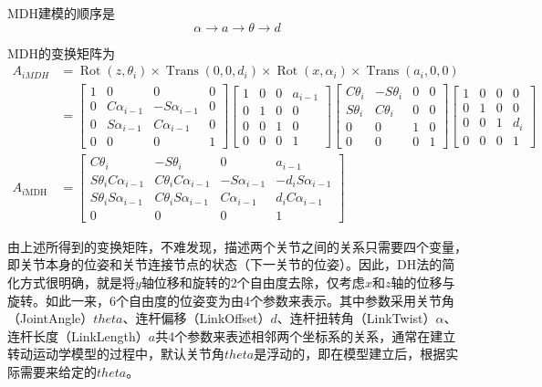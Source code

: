 \documentclass[UTF8]{article}%
\newcommand{\n}{\par}%
\begin{document}
\begin{spacing}{1.5}
	MDH建模的顺序是$$\alpha\rightarrow a\rightarrow\theta\rightarrow d$$\n
	MDH的变换矩阵为\\
	$\begin{aligned}
		A_{iMDH}&=\operatorname{Rot}\left(z,\theta_{i}\right)\times\operatorname{Trans}\left(0,0,d_{i}\right)\times\operatorname{Rot}\left(x,\alpha_{i}\right)\times\operatorname{Trans}\left(a_{i},0,0\right)\\
		&=\left[\begin{array}{cccc}
			1&0&0&0\\
			0&C\alpha_{i-1}&-S\alpha_{i-1}&0\\
			0&S\alpha_{i-1}&C\alpha_{i-1}&0\\
			0&0&0&1\end{array}\right]
		\left[\begin{array}{cccc}
			1&0&0&a_{i-1}\\
			0&1&0&0\\
			0&0&1&0\\
			0&0&0&1\end{array}\right]
		\left[\begin{array}{cccc}
			C\theta_{i}&-S\theta_{i}&0&0\\
			S\theta_{i}&C\theta_{i}&0&0\\
			0&0&1&0\\
			0&0&0&1\end{array}\right]
		\left[\begin{array}{cccc}
			1&0&0&0\\
			0&1&0&0\\
			0&0&1&d_{i}\\
			0&0&0&1\end{array}\right]\\
		A_{i\mathrm{MDH}}&=\left[\begin{array}{cccc}
			C\theta_{i}&-S\theta_{i}&0&a_{i-1}\\
			S\theta_{i}C\alpha_{i-1}&C\theta_{i}C\alpha_{i-1}&-S\alpha_{i-1}&-d_{i}S\alpha_{i-1}\\
			S\theta_{i}S\alpha_{i-1}&C\theta_{i}S\alpha_{i-1}&C\alpha_{i-1}&d_{i}C\alpha_{i-1}\\
			0&0&0&1\end{array}\right]\end{aligned}$\\\n
	由上述所得到的变换矩阵，不难发现，描述两个关节之间的关系只需要四个变量，即关节本身的位姿和关节连接节点的状态（下一关节的位姿）。因此，DH法的简化方式很明确，就是将$y$轴位移和旋转的2个自由度去除，仅考虑$x$和$z$轴的位移与旋转。如此一来，6个自由度的位姿变为由4个参数来表示。其中参数采用关节角（JointAngle）$theta$、连杆偏移（LinkOffset）$d$、连杆扭转角（LinkTwist）$\alpha$、连杆长度（LinkLength）$a$共4个参数来表述相邻两个坐标系的关系，通常在建立转动运动学模型的过程中，默认关节角$theta$是浮动的，即在模型建立后，根据实际需要来给定的$theta$。\n

\end{spacing}
\end{document}
